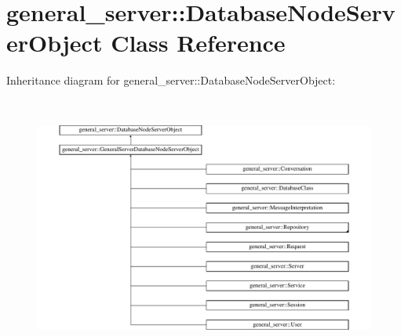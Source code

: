 \hypertarget{classgeneral__server_1_1DatabaseNodeServerObject}{\section{general\-\_\-server\-:\-:\-Database\-Node\-Server\-Object \-Class \-Reference}
\label{classgeneral__server_1_1DatabaseNodeServerObject}
}
\-Inheritance diagram for general\-\_\-server\-:\-:\-Database\-Node\-Server\-Object\-:\begin{figure}[H]
\begin{center}
\leavevmode
\includegraphics[height=8.651686cm]{classgeneral__server_1_1DatabaseNodeServerObject}
\end{center}
\end{figure}
